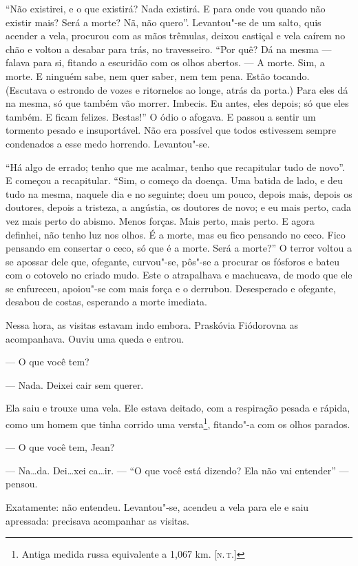 ``Não existirei, e o que existirá? Nada existirá. E para onde vou quando
não existir mais? Será a morte? Nã, não quero''. Levantou"-se de um
salto, quis acender a vela, procurou com as mãos trêmulas, deixou
castiçal e vela caírem no chão e voltou a desabar para trás, no
travesseiro. ``Por quê? Dá na mesma --- falava para si, fitando a
escuridão com os olhos abertos. --- A morte. Sim, a morte. E ninguém sabe,
nem quer saber, nem tem pena. Estão tocando. (Escutava o estrondo de
vozes e ritornelos ao longe, atrás da porta.) Para eles dá na mesma, só
que também vão morrer. Imbecis. Eu antes, eles depois; só que eles
também. E ficam felizes. Bestas!'' O ódio o afogava. E passou a sentir
um tormento pesado e insuportável. Não era possível que todos estivessem
sempre condenados a esse medo horrendo. Levantou"-se.

``Há algo de errado; tenho que me acalmar, tenho que recapitular tudo de
novo''. E começou a recapitular. ``Sim, o começo da doença. Uma batida
de lado, e deu tudo na mesma, naquele dia e no seguinte; doeu um pouco,
depois mais, depois os doutores, depois a tristeza, a angústia, os
doutores de novo; e eu mais perto, cada vez mais perto do abismo. Menos
forças. Mais perto, mais perto. E agora definhei, não tenho luz nos
olhos. É a morte, mas eu fico pensando no ceco. Fico pensando em
consertar o ceco, só que é a morte. Será a morte?'' O terror voltou a se
apossar dele que, ofegante, curvou"-se, pôs"-se a procurar os fósforos e
bateu com o cotovelo no criado mudo. Este o atrapalhava e machucava, de
modo que ele se enfureceu, apoiou"-se com mais força e o derrubou.
Desesperado e ofegante, desabou de costas, esperando a morte imediata.

Nessa hora, as visitas estavam indo embora. Praskóvia Fiódorovna as
acompanhava. Ouviu uma queda e entrou.

--- O que você tem?

--- Nada. Deixei cair sem querer.

Ela saiu e trouxe uma vela. Ele estava deitado, com a respiração pesada
e rápida, como um homem que tinha corrido uma versta\footnote{Antiga
  medida russa equivalente a 1,067 km. {[}\textsc{n.\,t.}{]}}, fitando"-a com os
olhos parados.

--- O que você tem, Jean?

--- Na\ldots{}da. Dei\ldots{}xei ca\ldots{}ir. --- ``O que você está dizendo? Ela não vai
entender'' --- pensou.

Exatamente: não entendeu. Levantou"-se, acendeu a vela para ele e saiu
apressada: precisava acompanhar as visitas.

